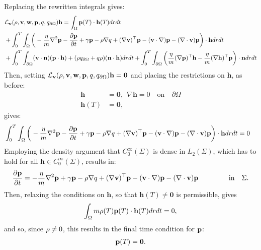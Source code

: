 Replacing the rewritten integrals gives:
\begin{align*}
&\mathcal{L}_{\mathbf{v}}(\rho,\mathbf{v},\mathbf{w},\mathbf{p},q,{q}_{\partial \Omega}) \mathbf{h} = \int_\Omega\mathbf{p}(T) \cdot \mathbf{h}(T) dr dt\\
&+\int_0^T \int_\Omega 
\bigg( - \frac{\eta}{m} \nabla^2 \mathbf{p} -   \frac{\partial \mathbf{p}}{\partial t} + \gamma\mathbf{p}-\rho\nabla q +(\nabla \mathbf{v})^\top\mathbf{p} 
- (\mathbf{v} \cdot \nabla)\mathbf{p} -  (\nabla \cdot \mathbf{v})\mathbf{p}   \bigg)\cdot  \mathbf{h} drdt\\
& +\int_0^T \int_{\partial\Omega} (\mathbf{v} \cdot \mathbf{n})(\mathbf{p} \cdot \mathbf{h}) +(\rho  {q}_{\partial \Omega} + q \rho)  (\mathbf{n}\cdot \mathbf{h}) dr dt + \int_0^T \int_{\partial \Omega}  \bigg( \frac{\eta}{m}  (\nabla \mathbf{p})^\top \mathbf{h}  - \frac{\eta}{m}(\nabla \mathbf{h})^\top \mathbf{p} \bigg) \cdot \mathbf{n} dr dt\\
\end{align*}
Then, setting $\mathcal{L}_{\mathbf{v}}(\rho,\mathbf{v},\mathbf{w},\mathbf{p},q,{q}_{\partial \Omega}) \mathbf{h}=\mathbf{0}$ and placing the restrictions on $\mathbf{h}$, as before:
\begin{align*}
\mathbf{h}&=\mathbf{0}, \ \ \nabla \mathbf{h} = 0 \quad \text{on} \quad \partial \Omega\\
\mathbf{h}(T)&=\mathbf{0},
\end{align*}
gives:
\begin{align*}
&\int_0^T \int_\Omega 
\bigg( - \frac{\eta}{m} \nabla^2 \mathbf{p} -   \frac{\partial \mathbf{p}}{\partial t} + \gamma\mathbf{p}-\rho\nabla q +(\nabla \mathbf{v})^\top\mathbf{p} 
- (\mathbf{v} \cdot \nabla)\mathbf{p} -  (\nabla \cdot \mathbf{v})\mathbf{p}    \bigg)\cdot  \mathbf{h} drdt = 0
\end{align*}
Employing the density argument that $C_0^\infty(\Sigma)$ is dense in $L_2(\Sigma)$, which has to hold for all $\mathbf{h}\in C_0^\infty(\Sigma)$, results in:
\begin{align*}
   \frac{\partial \Adja}{\partial t} =  - \frac{\eta}{m} \nabla^2 \Adja  + \gamma\Adja-\Sta\nabla \Adjb +(\nabla \Stav)^\top\Adja 
- (\Stav \cdot \nabla)\Adja -  (\nabla \cdot \Stav)\Adja     \ \qquad\qquad \text{in} \quad \Sigma.
\end{align*}
Then, relaxing the conditions on $\mathbf{h}$, so that $\mathbf{h}(T) \neq \mathbf{0} $ is permissible, gives
\begin{align*}
 \int_\Omega m \rho(T) \mathbf{p}(T) \cdot \mathbf{h}(T) dr dt=0,
\end{align*}
and so, since $\rho \neq 0$, this results in the final time condition for $\mathbf{p}$:
\begin{align}
\mathbf{p}(T)=\mathbf{0}.
\end{align}
